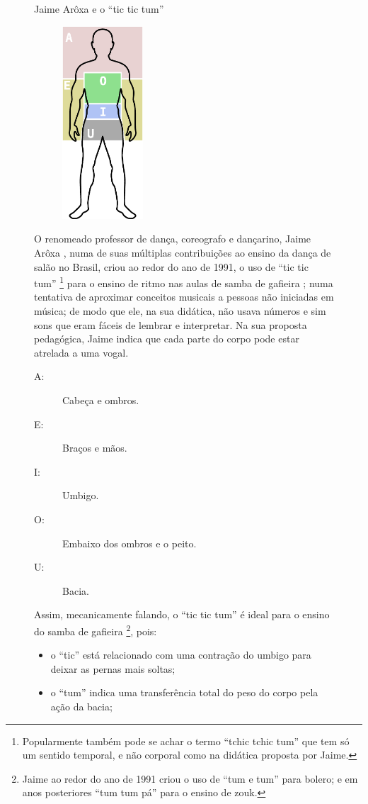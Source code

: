 \begin{figure}[hb!]
\begin{elaboracion}{Jaime Arôxa e o ``tic tic tum''}
\begin{figure}
\centering
\includegraphics[width=0.33\textwidth]{chapters/cap-musicalidade-percepcion/aroxa-tic-tic-tum.eps}
\end{figure}
O renomeado professor de dança, coreografo e  dançarino, Jaime Arôxa \cite{JaimeAroxaSite},
numa de suas múltiplas contribuições ao ensino da dança de salão no Brasil,
criou ao redor do ano de 1991, 
o uso de ``tic tic tum''
\footnote{Popularmente também pode se achar o termo ``tchic tchic tum'' que tem só um sentido temporal, 
e não corporal como na didática proposta por Jaime.} 
para o ensino de ritmo nas aulas de samba de gafieira \cite{EntrevistaJaimeAroxa1};
numa tentativa de aproximar conceitos musicais a pessoas não iniciadas em música;
de modo que ele, na sua didática, não usava números e sim sons que eram fáceis de lembrar e interpretar.
Na sua proposta pedagógica, 
Jaime indica que cada parte do corpo pode estar atrelada a uma vogal.
\begin{description} 
\item[A:] Cabeça e ombros. 
\item[E:] Braços e mãos. 
\item[I:] Umbigo.
\item[O:] Embaixo dos ombros e o peito.
\item[U:] Bacia.
\end{description}
Assim, mecanicamente falando, o ``tic tic tum'' é ideal para o ensino do samba de gafieira
\footnote{Jaime ao redor do ano de 1991 criou o uso de ``tum e tum'' para bolero;
e em anos posteriores ``tum tum pá'' para o ensino de zouk.},
pois:
\begin{itemize} 
\item o ``tic'' está relacionado com uma contração do umbigo para deixar as pernas mais soltas;
\item o ``tum'' indica uma transferência total do peso do corpo pela ação da bacia;
\end{itemize}



\end{elaboracion}
\end{figure}
